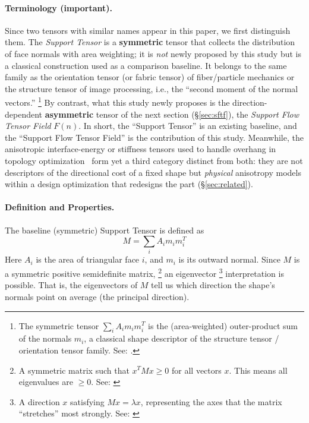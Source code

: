 \documentclass[11pt,a4paper]{article}
\begin{document}
\paragraph{Terminology (important).}
Since two tensors with similar names appear in this paper, we first distinguish them.
The \emph{Support Tensor} is a \textbf{symmetric} tensor that collects the distribution of face normals with area weighting;
it is \emph{not} newly proposed by this study but is a classical construction used as a comparison baseline.
It belongs to the same family as the orientation tensor (or fabric tensor) of fiber/particle mechanics
or the structure tensor of image processing, i.e., the ``second moment of the normal vectors.''%
\footnote{The symmetric tensor $\sum_i A_i m_i m_i^T$ is the (area-weighted) outer-product sum of the normals $m_i$, a classical shape descriptor of the structure
tensor / orientation tensor family. See: \cite{kanatani1984}.}
By contrast, what this study newly proposes is the direction-dependent \textbf{asymmetric}
tensor of the next section (\S\ref{sec:sftf}), the \emph{Support Flow Tensor Field} $F(n)$.
In short, the ``Support Tensor'' is an existing baseline, and the ``Support Flow Tensor Field'' is the contribution of this study.
Meanwhile, the anisotropic interface-energy or stiffness tensors used to handle overhang in topology optimization~\cite{garcke2023,shin2025}
form yet a third category distinct from both: they are not descriptors of the directional cost of a fixed shape
but \emph{physical} anisotropy models within a design optimization that redesigns the part (\S\ref{sec:related}).

\paragraph{Definition and Properties.}
The baseline (symmetric) Support Tensor is defined as
\begin{equation}
M
=
\sum_i
A_i m_i m_i^T
\end{equation}
Here $A_i$ is the area of triangular face $i$, and $m_i$ is its outward normal.
Since $M$ is a symmetric positive semidefinite matrix,%
\footnote{A symmetric matrix such that $x^TMx\ge0$ for all vectors $x$. This means all eigenvalues are $\ge0$.
See: \cite{hornjohnson}}
an eigenvector%
\footnote{A direction $x$ satisfying $Mx=\lambda x$, representing the axes that the matrix ``stretches'' most strongly.
See: \cite{golubvanloan}}
interpretation is possible.
That is, the eigenvectors of $M$ tell us which direction the shape's normals point on average (the principal direction).
\end{document}
